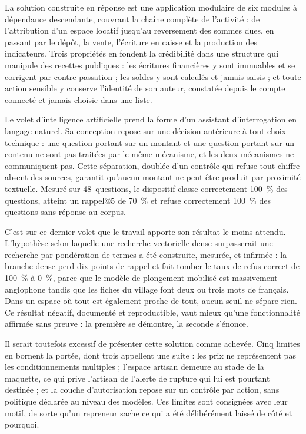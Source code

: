 La solution construite en réponse est une application modulaire de six modules à dépendance descendante, couvrant la chaîne complète de l'activité : de l'attribution d'un espace locatif jusqu'au reversement des sommes dues, en passant par le dépôt, la vente, l'écriture en caisse et la production des indicateurs. Trois propriétés en fondent la crédibilité dans une structure qui manipule des recettes publiques : les écritures financières y sont immuables et se corrigent par contre-passation ; les soldes y sont calculés et jamais saisis ; et toute action sensible y conserve l'identité de son auteur, constatée depuis le compte connecté et jamais choisie dans une liste.

Le volet d'intelligence artificielle prend la forme d'un assistant d'interrogation en langage naturel. Sa conception repose sur une décision antérieure à tout choix technique : une question portant sur un montant et une question portant sur un contenu ne sont pas traitées par le même mécanisme, et les deux mécanismes ne communiquent pas. Cette séparation, doublée d'un contrôle qui refuse tout chiffre absent des sources, garantit qu'aucun montant ne peut être produit par proximité textuelle. Mesuré sur 48~questions, le dispositif classe correctement 100~\% des questions, atteint un rappel@5 de 70~\% et refuse correctement 100~\% des questions sans réponse au corpus.

C'est sur ce dernier volet que le travail apporte son résultat le moins attendu. L'hypothèse selon laquelle une recherche vectorielle dense surpasserait une recherche par pondération de termes a été construite, mesurée, et infirmée : la branche dense perd dix points de rappel et fait tomber le taux de refus correct de 100~\% à 0~\%, parce que le modèle de plongement mobilisé est massivement anglophone tandis que les fiches du village font deux ou trois mots de français. Dans un espace où tout est également proche de tout, aucun seuil ne sépare rien. Ce résultat négatif, documenté et reproductible, vaut mieux qu'une fonctionnalité affirmée sans preuve : la première se démontre, la seconde s'énonce.

Il serait toutefois excessif de présenter cette solution comme achevée. Cinq limites en bornent la portée, dont trois appellent une suite : les prix ne représentent pas les conditionnements multiples ; l'espace artisan demeure au stade de la maquette, ce qui prive l'artisan de l'alerte de rupture qui lui est pourtant destinée ; et la couche d'autorisation repose sur un contrôle par action, sans politique déclarée au niveau des modèles. Ces limites sont consignées avec leur motif, de sorte qu'un repreneur sache ce qui a été délibérément laissé de côté et pourquoi.

